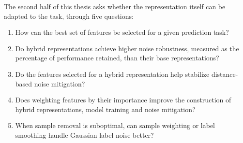 The second half of this thesis asks whether the representation itself can be adapted to the task, through five questions:
\begin{enumerate}
    \item How can the best set of features be selected for a given prediction task?
    \item Do hybrid representations achieve higher noise robustness, measured as the percentage of performance retained, than their base representations?
    \item Do the features selected for a hybrid representation help stabilize distance-based noise mitigation?
    \item Does weighting features by their importance improve the construction of hybrid representations, model training and noise mitigation?
    \item When sample removal is suboptimal, can sample weighting or label smoothing handle Gaussian label noise better?
\end{enumerate}

